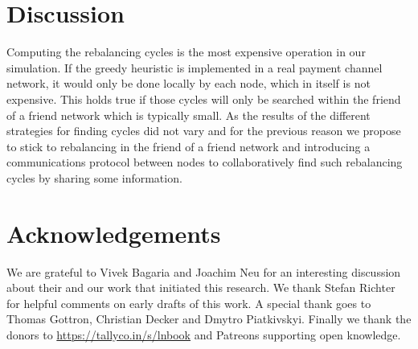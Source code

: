 \documentclass[conference]{IEEEtran}
\begin{document}
\section{Discussion}
\label{sec:conclusion}

Computing the rebalancing cycles is the most expensive operation in our simulation.
If the greedy heuristic is implemented in a real payment channel network, it would only be 
done locally by each node, which in itself is not expensive.
This holds true if those cycles will only be searched within the friend of a friend network which is typically small.
As the results of the different strategies for finding cycles did not vary and for the previous reason we propose to stick to rebalancing in the friend of a friend network and introducing a communications protocol between nodes to collaboratively find such rebalancing cycles by sharing some information.


\section{Acknowledgements}
\label{sec:ack}

We are grateful to Vivek Bagaria and Joachim Neu for an interesting discussion about their and our work that initiated this research. We thank Stefan Richter for helpful comments on early drafts of this work. A special thank goes to Thomas Gottron, Christian Decker and Dmytro Piatkivskyi. 
Finally we thank the donors to \url{https://tallyco.in/s/lnbook} and Patreons supporting open knowledge. 




\end{document}
